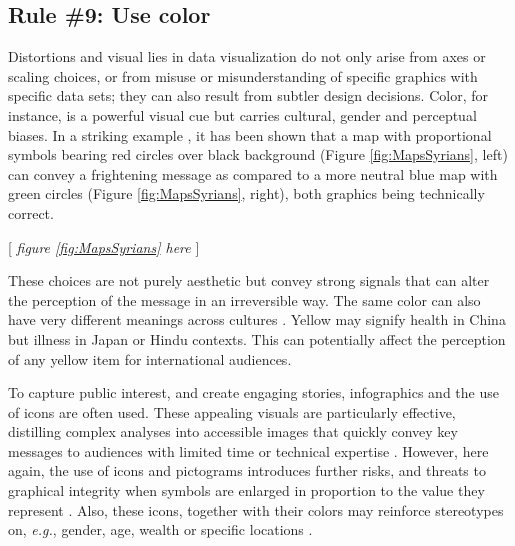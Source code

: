 \documentclass[11pt,twoside,a4paper]{article}
\begin{document}
\subsection*{Rule \#9: Use color}

Distortions and visual lies in data visualization do not only arise from axes or scaling choices, or from misuse or misunderstanding of specific graphics with specific data sets;  they can also result from subtler design decisions. Color, for instance, is a powerful visual cue but carries cultural, gender and perceptual biases. In a striking example \citep{bahoken2018English}, it has been shown that a map with proportional symbols  bearing red circles over black background (Figure \ref{fig:MapsSyrians}, left) can convey a frightening message as compared to a more neutral blue map with green circles (Figure \ref{fig:MapsSyrians}, right), both graphics being technically correct.  

\begin{center}
    [ \textit{figure \ref{fig:MapsSyrians}  here}  ]
\end{center}


These choices are not purely aesthetic but convey strong signals that can alter the perception of the message in an irreversible way. The same color can also have very different meanings across cultures \citep{mccandless2012information}. Yellow may signify health in China but illness in Japan or Hindu contexts. This can potentially affect the perception of any yellow item for international audiences. 

 To capture public interest, and create engaging stories, infographics and the use of icons are  often used. These appealing visuals are  particularly effective, distilling complex analyses into accessible images that quickly convey key messages  to audiences with limited time or technical expertise \citep{page2021DTVCovid}. However, here again, the use of icons and pictograms introduces further risks, and threats to   graphical integrity when symbols are enlarged in proportion to the value they represent \citep{Tufte2001}. Also, these icons, together with their colors may reinforce stereotypes on, \textit{e.g.}, gender, age, wealth or specific locations \citep{ UNVolunteers2020, or2013data}.
\end{document}
